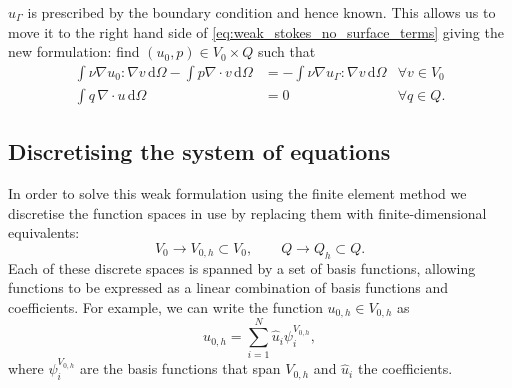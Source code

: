 \documentclass[thesis]{subfiles}
\begin{document}
$u_\Gamma$ is prescribed by the boundary condition and hence known.
This allows us to move it to the right hand side of \cref{eq:weak_stokes_no_surface_terms} giving the new formulation: find $(u_0, p) \in V_0 \times Q$ such that
\begin{equation} \label{eq:weak_stokes}
  \begin{aligned}
    \int \nu \nabla u_0 : \nabla v \, \textrm{d}\Omega
    - \int p \nabla \cdot v \, \textrm{d}\Omega
    &=
    - \int \nu \nabla u_\Gamma : \nabla v \, \textrm{d}\Omega
    &\forall v \in V_0 \\
    \int q \, \nabla \cdot u \, \textrm{d}\Omega
    &= 0
    &\forall q \in Q.
  \end{aligned}
\end{equation}

\subsection{Discretising the system of equations}

In order to solve this weak formulation using the finite element method we discretise the function spaces in use by replacing them with finite-dimensional equivalents:
\begin{equation}
  V_0 \to V_{0,h} \subset V_0,
  \quad
  \quad
  Q \to Q_h \subset Q.
\end{equation}
Each of these discrete spaces is spanned by a set of basis functions, allowing functions to be expressed as a linear combination of basis functions and coefficients.
For example, we can write the function $u_{0,h} \in V_{0,h}$ as
\begin{equation}
  u_{0,h} = \sum^N_{i=1} \hat u_i \psi^{V_{0,h}}_i,
\end{equation}
where $\psi^{V_{0,h}}_i$ are the basis functions that span $V_{0,h}$ and $\hat u_i$ the coefficients.
\end{document}

